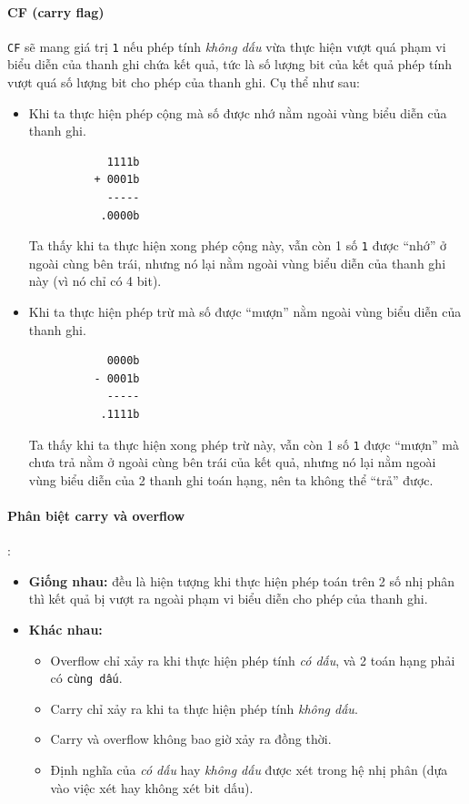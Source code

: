 \documentclass[12pt]{report}
\newcommand{\code}[1]{\texttt{#1}}
\begin{document}
\paragraph{CF (carry flag)}
\code{CF} sẽ mang giá trị \code 1 nếu phép tính \textit{không dấu} vừa thực hiện vượt quá phạm vi biểu diễn của thanh ghi chứa kết quả, tức là số lượng bit của kết quả phép tính vượt quá số lượng bit cho phép của thanh ghi. Cụ thể như sau:
\begin{itemize}
    \item Khi ta thực hiện phép cộng mà số được nhớ nằm ngoài vùng biểu diễn của thanh ghi.
        \begin{verbatim}
            1111b 
          + 0001b 
            -----
           .0000b 
        \end{verbatim}
    Ta thấy khi ta thực hiện xong phép cộng này, vẫn còn 1 số \code 1 được ``nhớ'' ở ngoài cùng bên trái, nhưng nó lại nằm ngoài vùng biểu diễn của thanh ghi này (vì nó chỉ có 4 bit).
    \item Khi ta thực hiện phép trừ mà số được ``mượn'' nằm ngoài vùng biểu diễn của thanh ghi.
        \begin{verbatim}
            0000b 
          - 0001b 
            -----
           .1111b 
        \end{verbatim}
    Ta thấy khi ta thực hiện xong phép trừ này, vẫn còn 1 số \code 1 được ``mượn'' mà chưa trả nằm ở ngoài cùng bên trái của kết quả, nhưng nó lại nằm ngoài vùng biểu diễn của 2 thanh ghi toán hạng, nên ta không thể ``trả'' được.
\end{itemize}

\paragraph{Phân biệt carry và overflow}:
\begin{itemize}
    \item \textbf{Giống nhau:} đều là hiện tượng khi thực hiện phép toán trên 2 số nhị phân thì kết quả bị vượt ra ngoài phạm vi biểu diễn cho phép của thanh ghi.
    \item \textbf{Khác nhau:} \begin{itemize}
        \item Overflow chỉ xảy ra khi thực hiện phép tính \textit{có dấu}, và 2 toán hạng phải có \code{cùng dấu}. 
        \item Carry chỉ xảy ra khi ta thực hiện phép tính \textit{không dấu}.
        \item Carry và overflow không bao giờ xảy ra đồng thời.
        \item Định nghĩa của \textit{có dấu} hay \textit{không dấu} được xét trong hệ nhị phân (dựa vào việc xét hay không xét bit dấu).
    \end{itemize}
\end{itemize}
\end{document}
